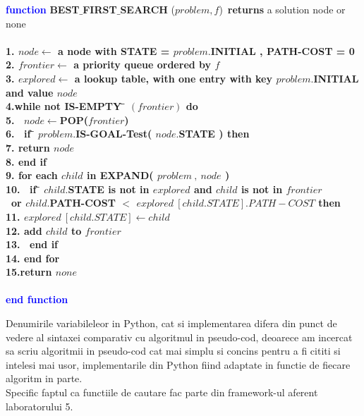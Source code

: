 \documentclass{article}
\begin{document}
\begin{center}
\begin{tabbing}
\large
\indent\textbf{\textcolor{blue}{func}}\=\textbf{\textcolor{blue}{tion}}
\textsc{\bfseries{BEST$\_$FIRST$\_$SEARCH}}{ ($problem,f$)}\ \textbf{returns} a solution node or none\\\\ 
\bfseries{1.}\indent \> $node \leftarrow$ a node with STATE = $problem.$INITIAL , PATH-COST = 0\\
\bfseries{2.}\indent \> $frontier \leftarrow $ a priority queue ordered by $f$\\
\bfseries{3.}\indent \> $explored  \leftarrow $ a lookup table, with one entry with key $problem.$INITIAL and value $node$\\
\bfseries{4.}\indent\>\textbf{while not} IS-EMPTY  \= $( frontier )$ \textbf{ do}\\
\bfseries{5.}\indent\> \ $node \leftarrow $POP($frontier$)\\
\bfseries{6.}\indent\>     \ \textbf{if } \= $problem.$IS-GOAL-Test( $node.$STATE ) \textbf{then}\\
\bfseries{7.}\indent\>   \>\textbf{return} $node$\\
\bfseries{8.}\indent\>      \textbf{end if}\\
\bfseries{9.}\indent\> \textbf{for each } $child$ \textbf{ in } EXPAND( $problem \ , \ node$ )\\
\bfseries{10.}\indent\>     \ \textbf{if } \= $child.$STATE \textbf{ is not } in $explored$ \textbf{and} $child$ \textbf{is not} in $frontier$\\ \indent\>     \> \ \textbf{or} $child.$PATH-COST $<$ $explored\ [child.STATE].PATH-COST$ \textbf{then}\\
\bfseries{11.}\indent\> \> $explored \ [child.STATE] \leftarrow child$\\
\bfseries{12.}\indent\> \> \textbf{add} $child$ \textbf{to} $frontier$\\
\bfseries{13.}\indent\>     \ \textbf{end if }\\
\bfseries{14.}\indent\> \textbf{end for}\\
\bfseries{15.}\indent\>\textbf{return} $none$\\\\
\indent\textbf{\textcolor{blue}{end }}\=\textbf{\textcolor{blue}{function}}
\end{tabbing}
\end{center}
\quad Denumirile variabileleor in Python, cat si implementarea difera din punct de vedere al sintaxei comparativ cu algoritmul in pseudo-cod, deoarece am incercat sa scriu algoritmii in pseudo-cod cat mai simplu si concins pentru a fi cititi si intelesi mai usor, implementarile din Python fiind adaptate in functie de fiecare algoritm in parte.\\ Specific faptul ca functiile de cautare fac parte din framework-ul aferent laboratorului 5.\par
\end{document}
